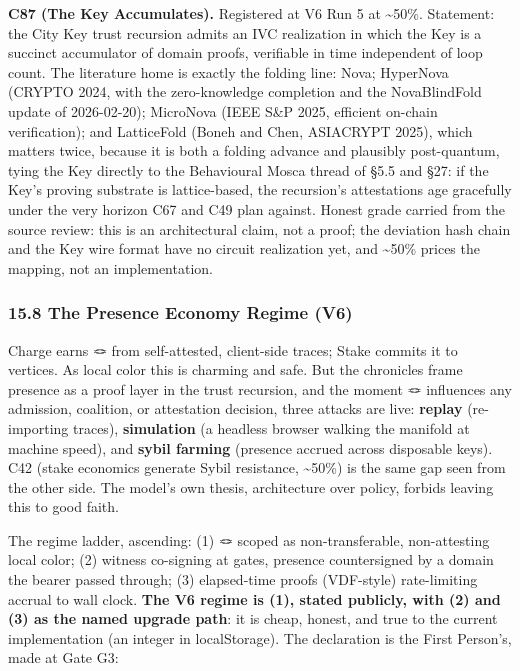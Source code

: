 \documentclass[
  11pt,
]{article}
\begin{document}
\textbf{C87 (The Key Accumulates).} Registered at V6 Run 5 at
\textasciitilde50\%. Statement: the City Key trust recursion admits an
IVC realization in which the Key is a succinct accumulator of domain
proofs, verifiable in time independent of loop count. The literature
home is exactly the folding line: Nova; HyperNova (CRYPTO 2024, with the
zero-knowledge completion and the NovaBlindFold update of 2026-02-20);
MicroNova (IEEE S\&P 2025, efficient on-chain verification); and
LatticeFold (Boneh and Chen, ASIACRYPT 2025), which matters twice,
because it is both a folding advance and plausibly post-quantum, tying
the Key directly to the Behavioural Mosca thread of §5.5 and §27: if the
Key's proving substrate is lattice-based, the recursion's attestations
age gracefully under the very horizon C67 and C49 plan against. Honest
grade carried from the source review: this is an architectural claim,
not a proof; the deviation hash chain and the Key wire format have no
circuit realization yet, and \textasciitilde50\% prices the mapping, not
an implementation.

\subsubsection{15.8 The Presence Economy Regime
(V6)}\label{the-presence-economy-regime-v6}

Charge earns 🪢 from self-attested, client-side traces; Stake commits it
to vertices. As local color this is charming and safe. But the
chronicles frame presence as a proof layer in the trust recursion, and
the moment 🪢 influences any admission, coalition, or attestation
decision, three attacks are live: \textbf{replay} (re-importing traces),
\textbf{simulation} (a headless browser walking the manifold at machine
speed), and \textbf{sybil farming} (presence accrued across disposable
keys). C42 (stake economics generate Sybil resistance,
\textasciitilde50\%) is the same gap seen from the other side. The
model's own thesis, architecture over policy, forbids leaving this to
good faith.

The regime ladder, ascending: (1) 🪢 scoped as non-transferable,
non-attesting local color; (2) witness co-signing at gates, presence
countersigned by a domain the bearer passed through; (3) elapsed-time
proofs (VDF-style) rate-limiting accrual to wall clock. \textbf{The V6
regime is (1), stated publicly, with (2) and (3) as the named upgrade
path}: it is cheap, honest, and true to the current implementation (an
integer in localStorage). The declaration is the First Person's, made at
Gate G3:
\end{document}
